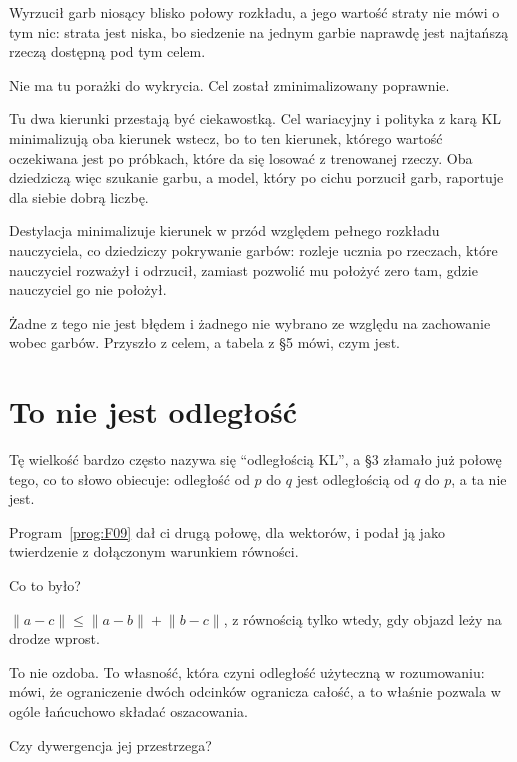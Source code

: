 \begin{fr}
\begin{ansblock}
Wyrzucił garb niosący blisko połowy rozkładu, a jego wartość straty nie mówi
o tym nic: strata jest niska, bo siedzenie na jednym garbie naprawdę jest
najtańszą rzeczą dostępną pod tym celem.

Nie ma tu porażki do wykrycia. Cel został zminimalizowany poprawnie.
\end{ansblock}

\begin{aibox}
Tu dwa kierunki przestają być ciekawostką. Cel wariacyjny i polityka z karą
KL minimalizują oba kierunek wstecz, bo to ten kierunek, którego wartość
oczekiwana jest po próbkach, które da się losować z trenowanej rzeczy. Oba
dziedziczą więc szukanie garbu, a model, który po cichu porzucił garb,
raportuje dla siebie dobrą liczbę.

Destylacja minimalizuje kierunek w przód względem pełnego rozkładu
nauczyciela, co dziedziczy pokrywanie garbów: rozleje ucznia po rzeczach,
które nauczyciel rozważył i odrzucił, zamiast pozwolić mu położyć zero tam,
gdzie nauczyciel go nie położył.

Żadne z tego nie jest błędem i żadnego nie wybrano ze względu na zachowanie
wobec garbów. Przyszło z celem, a tabela z §5 mówi, czym jest.
\end{aibox}

\end{fr}

\section{To nie jest odległość}
\label{sec:P30-notadistance}

\begin{fr}
Tę wielkość bardzo często nazywa się \enquote{odległością KL}, a §3 złamało
już połowę tego, co to słowo obiecuje: odległość od $p$ do $q$ jest
odległością od $q$ do $p$, a ta nie jest.

Program~\ref{prog:F09} dał ci drugą połowę, dla wektorów, i podał ją jako
twierdzenie z dołączonym warunkiem równości.

Co to było?
\dotline
\nextframe
\end{fr}

\begin{fr}

$\lVert a - c \rVert \le \lVert a - b \rVert + \lVert b - c \rVert$, z
równością tylko wtedy, gdy objazd leży na drodze wprost.

To nie ozdoba. To własność, która czyni odległość użyteczną w rozumowaniu:
mówi, że ograniczenie dwóch odcinków ogranicza całość, a to właśnie pozwala
w ogóle łańcuchowo składać oszacowania.

Czy dywergencja jej przestrzega?
\dotline
\nextframe
\end{fr}

